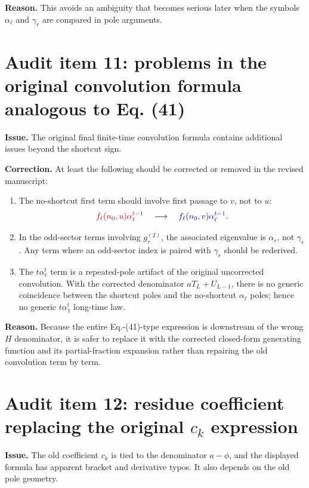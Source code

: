\documentclass[11pt]{article}
\newcommand{\Original}[1]{\textcolor{red!70!black}{#1}}
\newcommand{\Corrected}[1]{\textcolor{blue!65!black}{#1}}
\newcommand{\Issue}[1]{\par\medskip\noindent\textbf{Issue.} #1\par}
\newcommand{\Fix}[1]{\par\noindent\textbf{Correction.} #1\par}
\newcommand{\Reason}[1]{\par\noindent\textbf{Reason.} #1\par\medskip}
\begin{document}
\Reason{This avoids an ambiguity that becomes serious later when the symbols $\alpha_\ell$ and
$\gamma_r$ are compared in pole arguments.}

\section{Audit item 11: problems in the original convolution formula analogous to Eq. (41)}

\Issue{The original final finite-time convolution formula contains additional issues beyond the
shortcut sign.}

\Fix{At least the following should be corrected or removed in the revised manuscript:
\begin{enumerate}
  \item The no-shortcut first term should involve first passage to $v$, not to $u$:
  \begin{equation}
    \Original{f_\ell(n_0,u)\alpha_\ell^{t-1}}
    \quad\longrightarrow\quad
    \Corrected{f_\ell(n_0,v)\alpha_\ell^{t-1}}.
  \end{equation}
  \item In the odd-sector terms involving $g^{(2)}_r$, the associated eigenvalue is $\alpha_r$, not
  $\gamma_r$.  Any term where an odd-sector index is paired with $\gamma_r$ should be rederived.
  \item The $t\alpha_\ell^t$ term is a repeated-pole artifact of the original uncorrected
  convolution.  With the corrected denominator $aT_L+U_{L-1}$, there is no generic coincidence
  between the shortcut poles and the no-shortcut $\alpha_\ell$ poles; hence no generic
  $t\alpha_1^t$ long-time law.
\end{enumerate}}

\Reason{Because the entire Eq.-(41)-type expression is downstream of the wrong $H$ denominator, it
is safer to replace it with the corrected closed-form generating function and its partial-fraction
expansion rather than repairing the old convolution term by term.}

\section{Audit item 12: residue coefficient replacing the original $c_k$ expression}

\Issue{The old coefficient $c_k$ is tied to the denominator $a-\phi$, and the displayed formula has
apparent bracket and derivative typos.  It also depends on the old pole geometry.}
\end{document}
